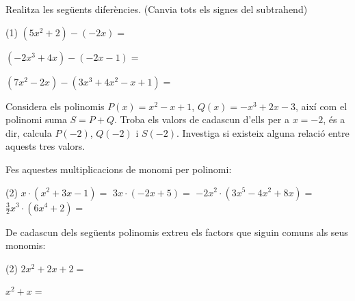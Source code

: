 \begin{mylist}
\answers{[$-5x^3+9x-1$, $-6x^3+3x^2-x+9$]}


\exer  \spen Realitza les següents diferències. (Canvia tots els signes del subtrahend) 
\begin{tasks}(1)
\task   $(5x^{2} +2)-(-2x)=$

\task   $(-2x^{3} +4x)-(-2x-1)=$            

\task  $ (7x^{2} -2x)-(3x^{3} +4x^{2} -x+1)=$
\end{tasks}

\answers{[$5x^2+2x+2$, $-2x^3+6x+1$, $-3x^3+3x^2-x-1$]}

\exer  Considera els polinomis $P(x)= x^{2} -x+1$, $Q(x)= -x^{3} +2x-3$, així com el polinomi suma $S=P+Q$. Troba els valors de cadascun d'ells per a $x=-2$, és a dir, calcula $P(-2)$, $Q(-2)$ i $S(-2)$. Investiga si existeix alguna relació entre aquests tres valors.   


\exer  Fes aquestes multiplicacions de monomi per polinomi:
\begin{tasks}(2)
	\task $x\cdot (x^2+3x-1)=$
	\task $3x\cdot (-2x+5)=$
	\task $-2x^2\cdot (3x^5 - 4x^2 + 8x)=$
	\task $\frac{3}{2}x^3\cdot (6x^4 + 2)=$
\end{tasks}  

\answers{[$x^3+3x^2-x$, $-6x^2+15x$, $-6x^7+8x^4-16x^3$, $9x^7+3x^3$]}

\exer \spen De cadascun dels següents polinomis extreu els factors que siguin comuns als seus monomis:

\begin{tasks}(2)
	\task  $2x^2+2x+2=$ 
	   
	\task  $x^2+x=$  
	

\end{tasks}
\end{mylist}
